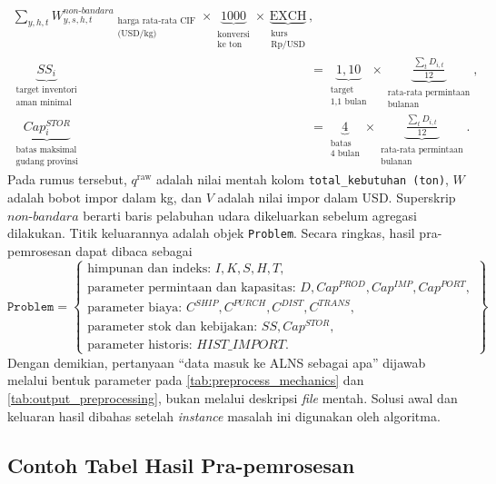 \documentclass{file/TA-ITS}
\theoremstyle{definition}
\theoremstyle{definition}
\theoremstyle{plain}
\begin{document}
\begin{align}
{{\sum_{y,h,t} W_{y,s,h,t}^{non\text{-}bandara}}}_{\substack{\text{harga rata-rata CIF}\\\text{(USD/kg)}}}
\times \underbrace{1000}_{\substack{\text{konversi}\\\text{ke ton}}} \times \underbrace{\mathrm{EXCH}}_{\substack{\text{kurs}\\\text{Rp/USD}}},\\
\underbrace{SS_i}_{\substack{\text{target inventori}\\\text{aman minimal}}} &= \underbrace{1{,}10}_{\substack{\text{target}\\\text{1,1 bulan}}} \times \underbrace{\frac{\sum_t D_{i,t}}{12}}_{\substack{\text{rata-rata permintaan}\\\text{bulanan}}},\\
\underbrace{Cap^{STOR}_i}_{\substack{\text{batas maksimal}\\\text{gudang provinsi}}} &= \underbrace{4}_{\substack{\text{batas}\\\text{4 bulan}}} \times \underbrace{\frac{\sum_t D_{i,t}}{12}}_{\substack{\text{rata-rata permintaan}\\\text{bulanan}}}.
\end{align}
Pada rumus tersebut, $q^{\mathrm{raw}}$ adalah nilai mentah kolom \texttt{total\_kebutuhan (ton)}, $W$ adalah bobot impor dalam kg, dan $V$ adalah nilai impor dalam USD. Superskrip $non\text{-}bandara$ berarti baris pelabuhan udara dikeluarkan sebelum agregasi dilakukan.
Titik keluarannya adalah objek \texttt{Problem}. Secara ringkas, hasil pra-pemrosesan dapat dibaca sebagai
\[
\texttt{Problem}
=
\left\{
\begin{array}{l}
\text{himpunan dan indeks: } I,K,S,H,T,\\
\text{parameter permintaan dan kapasitas: } D, Cap^{PROD}, Cap^{IMP}, Cap^{PORT},\\
\text{parameter biaya: } C^{SHIP}, C^{PURCH}, C^{DIST}, C^{TRANS},\\
\text{parameter stok dan kebijakan: } SS, Cap^{STOR},\\
\text{parameter historis: } HIST\_IMPORT.
\end{array}
\right\}
\]
Dengan demikian, pertanyaan ``data masuk ke ALNS sebagai apa'' dijawab melalui bentuk parameter pada \ref{tab:preprocess_mechanics} dan \ref{tab:output_preprocessing}, bukan melalui deskripsi \textit{file} mentah. Solusi awal dan keluaran hasil dibahas setelah \textit{instance} masalah ini digunakan oleh algoritma.

\subsection{Contoh Tabel Hasil Pra-pemrosesan}
\end{document}
